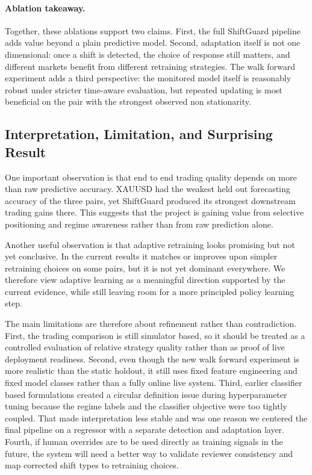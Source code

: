 \documentclass[11pt]{article}
\begin{document}
\paragraph{Ablation takeaway.}
Together, these ablations support two claims. First, the full ShiftGuard pipeline adds value beyond a plain predictive model. Second, adaptation itself is not one dimensional: once a shift is detected, the choice of response still matters, and different markets benefit from different retraining strategies. The walk forward experiment adds a third perspective: the monitored model itself is reasonably robust under stricter time-aware evaluation, but repeated updating is most beneficial on the pair with the strongest observed non stationarity.

\subsection{Interpretation, Limitation, and Surprising Result}
One important observation is that end to end trading quality depends on more than raw predictive accuracy. XAUUSD had the weakest held out forecasting accuracy of the three pairs, yet ShiftGuard produced its strongest downstream trading gains there. This suggests that the project is gaining value from selective positioning and regime awareness rather than from raw prediction alone.

Another useful observation is that adaptive retraining looks promising but not yet conclusive. In the current results it matches or improves upon simpler retraining choices on some pairs, but it is not yet dominant everywhere. We therefore view adaptive learning as a meaningful direction supported by the current evidence, while still leaving room for a more principled policy learning step.

The main limitations are therefore about refinement rather than contradiction. First, the trading comparison is still simulator based, so it should be treated as a controlled evaluation of relative strategy quality rather than as proof of live deployment readiness. Second, even though the new walk forward experiment is more realistic than the static holdout, it still uses fixed feature engineering and fixed model classes rather than a fully online live system. Third, earlier classifier based formulations created a circular definition issue during hyperparameter tuning because the regime labels and the classifier objective were too tightly coupled. That made interpretation less stable and was one reason we centered the final pipeline on a regressor with a separate detection and adaptation layer. Fourth, if human overrides are to be used directly as training signals in the future, the system will need a better way to validate reviewer consistency and map corrected shift types to retraining choices.
\end{document}
